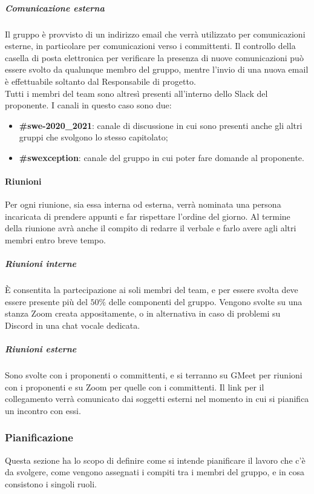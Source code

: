 \subparagraph{Comunicazione esterna}
Il gruppo è provvisto di un indirizzo email che verrà utilizzato per comunicazioni esterne, in particolare per comunicazioni verso i committenti. Il controllo della casella di posta elettronica per verificare la presenza di nuove comunicazioni può essere svolto da qualunque membro del gruppo, mentre l'invio di una nuova email è effettuabile soltanto dal Responsabile di progetto.\\
Tutti i membri del team sono altresì presenti all'interno dello Slack del proponente. I canali in questo caso sono due:
\begin{itemize}
    \item \textbf{\#swe-2020\_2021}: canale di discussione in cui sono presenti anche gli altri gruppi che svolgono lo stesso capitolato;
    \item \textbf{\#swexception}: canale del gruppo in cui poter fare domande al proponente.
\end{itemize}

\paragraph{Riunioni}
Per ogni riunione, sia essa interna od esterna, verrà nominata una persona incaricata di prendere appunti e far rispettare l'ordine del giorno. Al termine della riunione avrà anche il compito di redarre il verbale e farlo avere agli altri membri entro breve tempo.

\subparagraph{Riunioni interne}
È consentita la partecipazione ai soli membri del team, e per essere svolta deve essere presente più del $50\%$ delle componenti del gruppo. Vengono svolte su una stanza Zoom creata appositamente, o in alternativa in caso di problemi su Discord in una chat vocale dedicata.

\subparagraph{Riunioni esterne}
Sono svolte con i proponenti o committenti, e si terranno su GMeet per riunioni con i proponenti e su Zoom per quelle con i committenti. Il link per il collegamento verrà comunicato dai soggetti esterni nel momento in cui si pianifica un incontro con essi.

\subsubsection{Pianificazione} \label{_gestioneDiProcesso_pianificazione}
Questa sezione ha lo scopo di definire come si intende pianificare il lavoro che c'è da svolgere, come vengono assegnati i compiti tra i membri del gruppo, e in cosa consistono i singoli ruoli.

